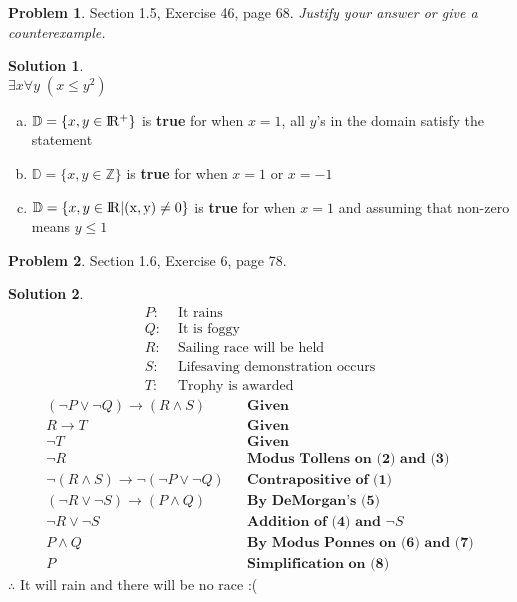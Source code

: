 \documentclass{article}
\theoremstyle{definition}
\newtheorem{problem}{Problem}
\newtheorem*{solution}{Solution}
\begin{document}
\begin{problem} Section 1.5, Exercise 46, page 68.
\textsl{Justify your answer or give a counterexample.}
\end{problem}
\begin{solution}\ \\ $\exists x \forall y \; (x \leq y^2)$
\begin{enumerate}[a)]
  \item $\mathbb{D} = \{x,y \in \rm I\!R^+ \}$ is \textbf{true} for when $x=1$, all $y$'s in the domain satisfy the statement
  \item $\mathbb{D} = \{x,y \in \mathbb{Z} \} $ is \textbf{true} for when $x=1$ or $x=-1$
  \item $\mathbb{D} = \{x,y \in \rm{ I\!R} |(x,y) \neq 0 \}$ is \textbf{true} for when $x=1$ and assuming that non-zero means $y\leq 1$
\end{enumerate}
\end{solution}

\begin{problem} Section 1.6, Exercise 6, page 78. 
\end{problem}
\begin{solution}
\begin{align*}
  P:& \text{ It rains} \\
  Q:& \text{ It is foggy} \\
  R:& \text{ Sailing race will be held} \\
  S:& \text{ Lifesaving demonstration occurs} \\
  T:& \text{ Trophy is awarded}
\end{align*}
\setcounter{equation}{0}
\begin{align}
  (\neg P \lor \neg Q) \rightarrow (R \land S)& &\textbf{Given} \\
  R \rightarrow T& & \textbf{Given} \\
  \neg T& &\textbf{Given} \\
  \neg R& &\textbf{Modus Tollens on (2) and (3)} \\
  \neg(R \land S) \rightarrow \neg(\neg P \lor \neg Q)& &\textbf{Contrapositive of (1)} \\
  (\neg R \lor \neg S) \rightarrow (P \land Q)& &\textbf{By DeMorgan's (5)} \\
  \neg R \lor \neg S& &\textbf{Addition of (4) and }\neg S \\
  P \land Q& &\textbf{By Modus Ponnes on (6) and (7)} \\
  P& &\textbf{Simplification on (8)}
\end{align}
$\therefore$ It will rain and there will be no race :(
\end{solution}
\end{document}
